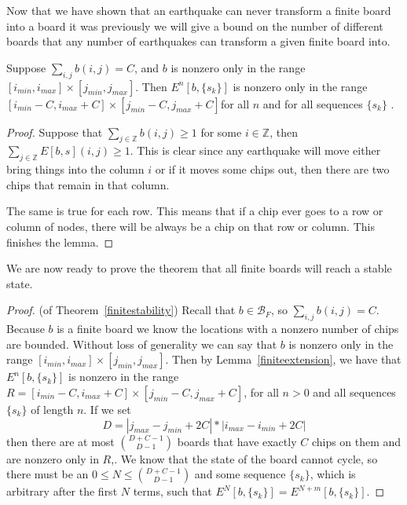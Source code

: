 \documentclass[runningheads,a4paper]{llncs}
\begin{document}
Now that we have shown that an earthquake can never transform a finite board into a board it was previously we will give a bound on the number of different boards that any number of earthquakes can transform a given finite board into.
\begin{lemma}
\label{finiteextension}
Suppose $\sum_{i,j} b(i,j) = C$, and $b$ is nonzero only in the range $[i_{min}, i_{max}] \times [j_{min}, j_{max}]$. Then   $E^n[b, \{s_k\}]$ is nonzero only in the range $[i_{min}-C, i_{max}+C] \times [j_{min}-C, j_{max}+C]$for all $n$ and for all sequences $\{s_k\}$ .
\end{lemma}

\begin{proof}
Suppose that $\sum_{j\in \mathbb{Z}} b(i,j) \geq 1$ for some $i \in \mathbb{Z}$, then $\sum_{j \in \mathbb{Z}} E[b, s](i,j) \geq 1$. This is clear since any earthquake will move either bring things into the column $i$ or if it moves some chips out, then there are two chips that remain in that column.

The same is true for each row. This means that if a chip ever goes to a row or column of nodes, there will be always be a chip on that row or column. This finishes the lemma. 
\end{proof}

We are now ready to prove the theorem that all finite boards will reach a stable state. 

\begin{proof}
(of Theorem~\ref{finitestability}) Recall that $b \in \mathcal{B}_F$, so $\sum_{i,j} b(i,j) = C$. Because $b$ is a finite board we know the locations with a nonzero number of chips are bounded.  Without loss of generality we can say that $b$ is nonzero only in the range $[i_{min}, i_{max}] \times [j_{min}, j_{max}]$. Then by Lemma~\ref{finiteextension}, we have that $E^n[b, \{s_k \}]$ is nonzero in the range $ R=[i_{min}-C, i_{max}+C] \times [j_{min}-C, j_{max}+C]$, for all $n>0$ and all sequences $\{ s_k \}$ of length $n$.
If we set 
\begin{equation*}
D= |j_{max}-j_{min} + 2C|*|i_{max} - i_{min} + 2C|
\end{equation*}
then there are at most  $\binom{D+C-1}{D-1}$  boards that have exactly $C$ chips on them and are nonzero only in $R$,. We know that the state of the board cannot cycle, so there must be an $0 \leq N \leq \binom{D+C-1}{D-1}$ and some sequence $\{s_k\}$, which is arbitrary after the first $N$ terms, such that $E^N[ b, \{s_k\}] = E^{N+m}[b, \{s_k\}]$. 
\end{proof}
\end{document}
